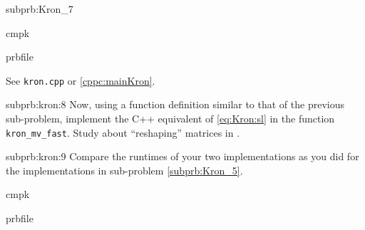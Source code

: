 \begin{samproblem}
\begin{subproblem}{subprb:Kron_7}
\begin{samwriteprbpart}{cmpk}
  \begin{writeverbatim}{prbfile}
    \begin{samsolution}
    See \texttt{kron.cpp} or \cref{cppc:mainKron}.
    \end{samsolution}
  \end{writeverbatim}
\end{samwriteprbpart}
\end{subproblem}

\begin{subproblem}{subprb:kron:8}
  Now, using a function definition similar to that of the previous sub-problem,
  implement the C++ equivalent of \eqref{eq:Kron:sl} in the function
  \texttt{kron\_mv\_fast}.
  Study  about ``reshaping'' matrices in \eigen{}.
\end{subproblem}

\begin{subproblem}{subprb:kron:9}
  Compare the runtimes of your two implementations as you did for the \matlab{}
  implementations in sub-problem \ref{subprb:Kron_5}.

\begin{samwriteprbpart}{cmpk}
  \begin{writeverbatim}{prbfile}
    \begin{samsolution}
      \begin{samcode}[C++11-code]{}{}
      \end{samcode}

    \end{samsolution}
  \end{writeverbatim}
\end{samwriteprbpart}
\end{subproblem}

\end{samproblem}
